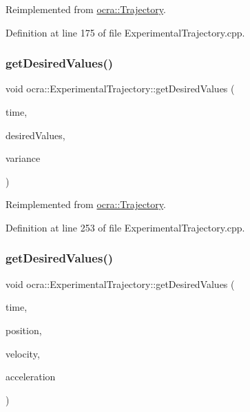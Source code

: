 Reimplemented from \hyperlink{classocra_1_1Trajectory_a2102a829e6dad497f7c773c346d499b7}{ocra\+::\+Trajectory}.



Definition at line 175 of file Experimental\+Trajectory.\+cpp.

\hypertarget{classocra_1_1ExperimentalTrajectory_a8d0b41849d2e99a13dd2ef1ae0b0eb46}{}\label{classocra_1_1ExperimentalTrajectory_a8d0b41849d2e99a13dd2ef1ae0b0eb46} 
\subsubsection{\texorpdfstring{get\+Desired\+Values()}{getDesiredValues()}\hspace{0.1cm}{\footnotesize\ttfamily [2/3]}}
{\footnotesize\ttfamily void ocra\+::\+Experimental\+Trajectory\+::get\+Desired\+Values (\begin{DoxyParamCaption}\item[{double}]{time,  }\item[{Eigen\+::\+Matrix\+Xd \&}]{desired\+Values,  }\item[{Eigen\+::\+Vector\+Xd \&}]{variance }\end{DoxyParamCaption})\hspace{0.3cm}{\ttfamily [virtual]}}



Reimplemented from \hyperlink{classocra_1_1Trajectory_aab6869cf5bc4a7c44eac36a0e49255b9}{ocra\+::\+Trajectory}.



Definition at line 253 of file Experimental\+Trajectory.\+cpp.

\hypertarget{classocra_1_1ExperimentalTrajectory_a8f920fd57e5207ac784411ba3a2594a3}{}\label{classocra_1_1ExperimentalTrajectory_a8f920fd57e5207ac784411ba3a2594a3} 
\subsubsection{\texorpdfstring{get\+Desired\+Values()}{getDesiredValues()}\hspace{0.1cm}{\footnotesize\ttfamily [3/3]}}
{\footnotesize\ttfamily void ocra\+::\+Experimental\+Trajectory\+::get\+Desired\+Values (\begin{DoxyParamCaption}\item[{double}]{time,  }\item[{Eigen\+::\+Displacementd \&}]{position,  }\item[{Eigen\+::\+Twistd \&}]{velocity,  }\item[{Eigen\+::\+Twistd \&}]{acceleration }\end{DoxyParamCaption})}



